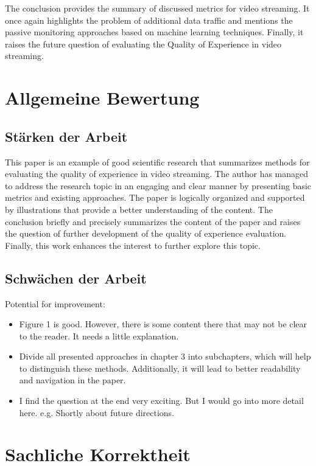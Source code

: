 \documentclass[a4paper,DIV=16]{scrartcl}
\begin{document}
The conclusion provides the summary of discussed metrics for video streaming. It once again highlights the problem of additional data traffic and mentions the passive monitoring approaches based on machine learning techniques. Finally, it raises the future question of evaluating the Quality of Experience in video streaming.


\section*{Allgemeine Bewertung}

\subsection*{Stärken der Arbeit}

This paper is an example of good scientific research that summarizes methods for evaluating the quality of experience in video streaming. The author has managed to address the research topic in an engaging and clear manner by presenting basic metrics and existing approaches. The paper is logically organized and supported by illustrations that provide a better understanding of the content. The conclusion briefly and precisely summarizes the content of the paper and raises the question of further development of the quality of experience evaluation. Finally, this work enhances the interest to further explore this topic.

\subsection*{Schwächen der Arbeit}

Potential for improvement:

\begin{itemize}
\item Figure 1 is good. However, there is some content there that may not be clear to the reader. It needs a little explanation.
\item Divide all presented approaches in chapter 3 into subchapters, which will help to distinguish these methods. Additionally, it will lead to better readability and navigation in the paper.
\item I find the question at the end very exciting. But I would go into more detail here. e.g. Shortly about future directions.
\end{itemize}  


\section*{Sachliche Korrektheit}
\end{document}
